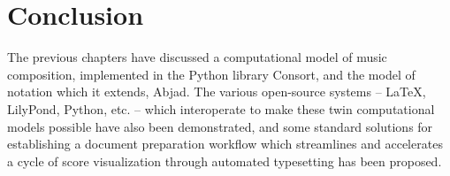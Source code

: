 \chapter{Conclusion}
\label{chap:conclusion}


The previous chapters have discussed a computational model of music
composition, implemented in the Python library Consort, and the model of
notation which it extends, Abjad. The various open-source systems -- \LaTeX{},
LilyPond, Python, etc. -- which interoperate to make these twin computational
models possible have also been demonstrated, and some standard solutions for
establishing a document preparation workflow which streamlines and accelerates
a cycle of score visualization through automated typesetting has been proposed. 

